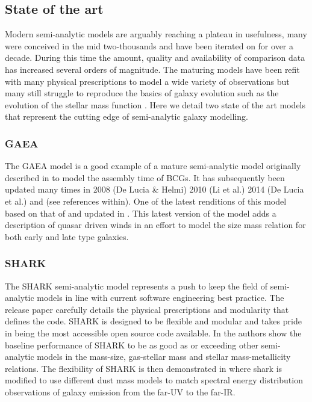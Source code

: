 \subsection{State of the art}
Modern semi-analytic models are arguably reaching a plateau in usefulness, many were conceived in the mid two-thousands and have been iterated on for over a decade. During this time the amount, quality and availability of comparison data has increased several orders of magnitude. The maturing models have been refit with many physical prescriptions to model a wide variety of observations but many still struggle to reproduce the basics of galaxy evolution such as the evolution of the stellar mass function \cite{Asquith2018CosmicModels}. Here we detail two state of the art models that represent the cutting edge of semi-analytic galaxy modelling.

\subsubsection{GAEA}
The GAEA model is a good example of a mature semi-analytic model originally described in \citet{DeLucia2007TheGalaxies} to model the assembly time of BCGs. It has subsequently been updated many times in 2008 (De Lucia & Helmi) 2010 (Li et al.) 2014 (De Lucia et al.) and \citet{Hirschmann2016GalaxyModel} (see references within).
One of the latest renditions of this model based on that of \citep{Xie2017H2-basedFormation} and updated in \citep{Zoldan2019TheEvolution}. This latest version of the model adds a description of quasar driven winds in an effort to model the size mass relation for both early and late type galaxies.

\subsubsection{SHARK}
The SHARK semi-analytic model represents a push to keep the field of semi-analytic models in line with current software engineering best practice. The release paper \citep{Lagos2018Shark:Formation} carefully details the physical prescriptions and modularity that defines the code. SHARK is designed to be flexible and modular and takes pride in being the most accessible open source code available. In \citet{Lagos2018Shark:Formation} the authors show the baseline performance of SHARK to be as good as or exceeding other semi-analytic models in the mass-size, gas-stellar mass and stellar mass-metallicity relations. The flexibility of SHARK is then demonstrated in \citet{Lagos2019FromModel} where  shark is modified to use different dust mass models to match spectral energy distribution observations of galaxy emission from the far-UV to the far-IR.

